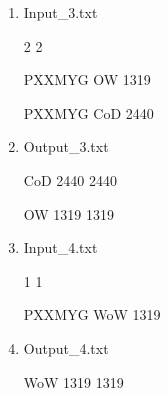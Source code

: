 \documentclass[10pt]{article}
\begin{document}
\begin{enumerate}
\begin{center}
{\raggedright
HotS 352 352
}

{\raggedright
LoL 2378 2378
}

{\raggedright
MC 61 61
}

{\raggedright
WoW 1951 975
}

	\end{center}

	\item Input\_3.txt
\begin{center}

{\raggedright
2 2
}

{\raggedright
PXXMYG OW 1319
}

{\raggedright
PXXMYG CoD 2440
}
	\end{center}

	\item Output\_3.txt
\begin{center}

{\raggedright
CoD 2440 2440
}


{\raggedright
OW 1319 1319
}
	\end{center}


	\item Input\_4.txt\hspace{15pt}
\begin{center}

{\raggedright
1 1
}

{\raggedright
PXXMYG WoW 1319
}
	\end{center}

	\item Output\_4.txt
\begin{center}

{\raggedright
WoW 1319 1319
}

	\end{center}
\end{enumerate}
\end{document}
